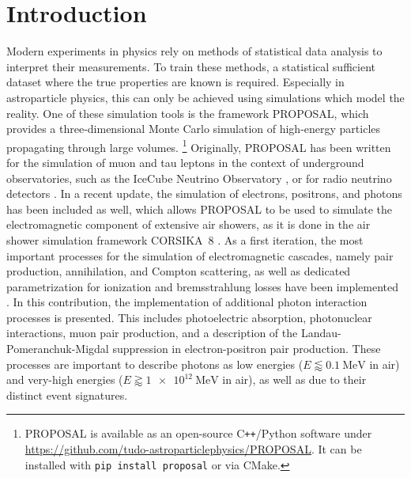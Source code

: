 \section{Introduction}

Modern experiments in physics rely on methods of statistical data analysis to interpret their measurements.
To train these methods, a statistical sufficient dataset where the true properties are known is required.
Especially in astroparticle physics, this can only be achieved using simulations which model the reality.
One of these simulation tools is the framework PROPOSAL, which provides a three-dimensional Monte Carlo simulation of high-energy particles propagating through large volumes. \footnote{PROPOSAL is available as an open-source C\texttt{++}/Python software under \url{https://github.com/tudo-astroparticlephysics/PROPOSAL}. It can be installed with \texttt{pip install proposal} or via CMake.}
Originally, PROPOSAL has been written for the simulation of muon and tau leptons in the context of underground observatories, such as the IceCube Neutrino Observatory \cite{icecubecollaboration2023measurement}, or for radio neutrino detectors \cite{PhysRevD.102.083011}.
In a recent update, the simulation of electrons, positrons, and photons has been included as well, which allows PROPOSAL to be used to simulate the electromagnetic component of extensive air showers, as it is done in the air shower simulation framework CORSIKA~8 \cite{icrc2023}. 
As a first iteration, the most important processes for the simulation of electromagnetic cascades, namely pair production, annihilation, and Compton scattering, as well as dedicated parametrization for ionization and bremsstrahlung losses have been implemented \cite{Alameddine:2021iq}.
In this contribution, the implementation of additional photon interaction processes is presented.
This includes photoelectric absorption, photonuclear interactions, muon pair production, and a description of the Landau-Pomeranchuk-Migdal suppression in electron-positron pair production.
These processes are important to describe photons as low energies ($E \lessapprox \SI{0.1}{\mega\electronvolt}$ in air) and very-high energies ($E \gtrapprox \SI{1e12}{\mega\electronvolt}$ in air), as well as due to their distinct event signatures.